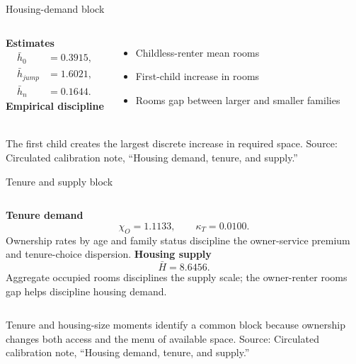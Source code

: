 \documentclass[aspectratio=169,11pt]{beamer}
\newcommand{\source}[1]{\vfill{\color{Muted}\tiny Source: #1}}
\newcommand{\tightitems}{\setlength{\itemsep}{0.55em}}
\begin{document}
\begin{frame}{Housing-demand block}
  \begin{columns}[T,onlytextwidth]
      \large\textbf{Estimates}
      \[
      \begin{aligned}
        \bar h_0&=0.3915,\\
        \bar h_{jump}&=1.6021,\\
        \bar h_n&=0.1644.
      \end{aligned}
      \]
      \large\textbf{Empirical discipline}
      \begin{itemize}\tightitems
        \item Childless-renter mean rooms
        \item First-child increase in rooms
        \item Rooms gap between larger and smaller families
      \end{itemize}
  \end{columns}

  \vspace{0.7em}
  The first child creates the largest discrete increase in required space.
  \source{Circulated calibration note, ``Housing demand, tenure, and supply.''}
\end{frame}

\begin{frame}{Tenure and supply block}
  \begin{columns}[T,onlytextwidth]
      \large\textbf{Tenure demand}
      \[
        \chi_O=1.1133,
        \qquad
        \kappa_T=0.0100.
      \]
      Ownership rates by age and family status discipline the owner-service premium and tenure-choice dispersion.
      \large\textbf{Housing supply}
      \[
        \bar H=8.6456.
      \]
      Aggregate occupied rooms disciplines the supply scale; the owner-renter rooms gap helps discipline housing demand.
  \end{columns}

  \vspace{0.8em}
  Tenure and housing-size moments identify a common block because ownership changes both access and the menu of available space.
  \source{Circulated calibration note, ``Housing demand, tenure, and supply.''}
\end{frame}
\end{document}

